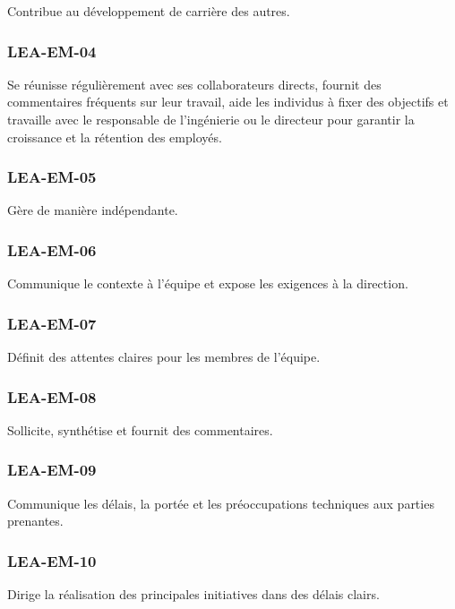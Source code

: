 \documentclass[a4paper, french, openany, 12pt]{book}
\newcommand\cha[1]{\textcolor{OliveGreen}{\textbf{\uppercase{lea-{#1}}}}}
\begin{document}
\begin{multicols}{2}
  Contribue au développement de carrière des autres.
  
  \subsubsection*{\cha{em-04}}

  Se réunisse régulièrement avec ses collaborateurs directs, fournit des commentaires fréquents sur leur travail, aide les
  individus à fixer des objectifs et travaille avec le responsable de l'ingénierie ou le directeur pour garantir la 
  croissance et la rétention des employés.

  \subsubsection*{\cha{em-05}}

  Gère de manière indépendante.
  
  \subsubsection*{\cha{em-06}}

  Communique le contexte à l'équipe et expose les exigences à la direction.

  \subsubsection*{\cha{em-07}}

  Définit des attentes claires pour les membres de l'équipe.
  
  \subsubsection*{\cha{em-08}}

  Sollicite, synthétise et fournit des commentaires.
  
  \subsubsection*{\cha{em-09}}

  Communique les délais, la portée et les préoccupations techniques aux parties prenantes.
  
  \subsubsection*{\cha{em-10}}

  Dirige la réalisation des principales initiatives dans des délais clairs.
  

\end{multicols}
\end{document}
